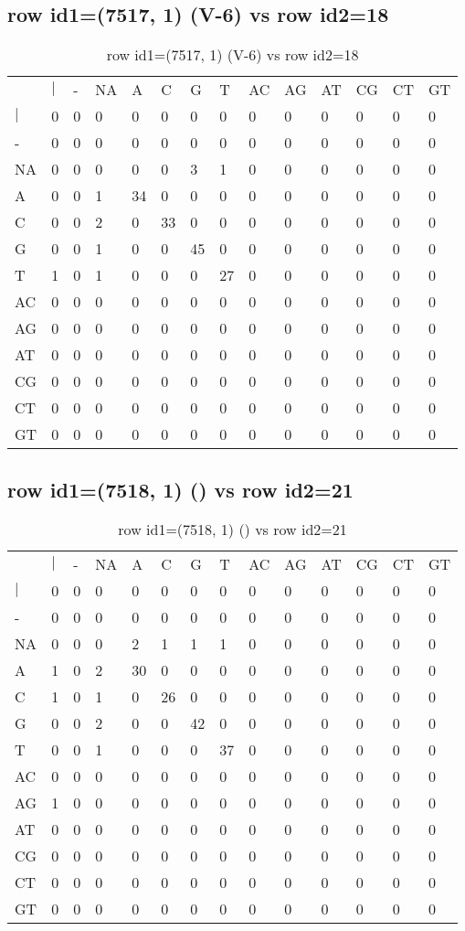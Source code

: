 \subsection{row id1=(7517, 1) (V-6) vs row id2=18}
\begin{center}
\begin{longtable}{|l|l|l|l|l|l|l|l|l|l|l|l|l|l|}
\caption{row id1=(7517, 1) (V-6) vs row id2=18} \label{table_dm324}\\
\hline
\\
\hline
&$|$&-&NA&A&C&G&T&AC&AG&AT&CG&CT&GT\\
$|$&0&0&0&0&0&0&0&0&0&0&0&0&0\\
-&0&0&0&0&0&0&0&0&0&0&0&0&0\\
NA&0&0&0&0&0&3&1&0&0&0&0&0&0\\
A&0&0&1&34&0&0&0&0&0&0&0&0&0\\
C&0&0&2&0&33&0&0&0&0&0&0&0&0\\
G&0&0&1&0&0&45&0&0&0&0&0&0&0\\
T&1&0&1&0&0&0&27&0&0&0&0&0&0\\
AC&0&0&0&0&0&0&0&0&0&0&0&0&0\\
AG&0&0&0&0&0&0&0&0&0&0&0&0&0\\
AT&0&0&0&0&0&0&0&0&0&0&0&0&0\\
CG&0&0&0&0&0&0&0&0&0&0&0&0&0\\
CT&0&0&0&0&0&0&0&0&0&0&0&0&0\\
GT&0&0&0&0&0&0&0&0&0&0&0&0&0\\
\hline
\end{longtable}
\end{center}

\subsection{row id1=(7518, 1) () vs row id2=21}
\begin{center}
\begin{longtable}{|l|l|l|l|l|l|l|l|l|l|l|l|l|l|}
\caption{row id1=(7518, 1) () vs row id2=21} \label{table_dm326}\\
\hline
\\
\hline
&$|$&-&NA&A&C&G&T&AC&AG&AT&CG&CT&GT\\
$|$&0&0&0&0&0&0&0&0&0&0&0&0&0\\
-&0&0&0&0&0&0&0&0&0&0&0&0&0\\
NA&0&0&0&2&1&1&1&0&0&0&0&0&0\\
A&1&0&2&30&0&0&0&0&0&0&0&0&0\\
C&1&0&1&0&26&0&0&0&0&0&0&0&0\\
G&0&0&2&0&0&42&0&0&0&0&0&0&0\\
T&0&0&1&0&0&0&37&0&0&0&0&0&0\\
AC&0&0&0&0&0&0&0&0&0&0&0&0&0\\
AG&1&0&0&0&0&0&0&0&0&0&0&0&0\\
AT&0&0&0&0&0&0&0&0&0&0&0&0&0\\
CG&0&0&0&0&0&0&0&0&0&0&0&0&0\\
CT&0&0&0&0&0&0&0&0&0&0&0&0&0\\
GT&0&0&0&0&0&0&0&0&0&0&0&0&0\\
\hline
\end{longtable}
\end{center}

